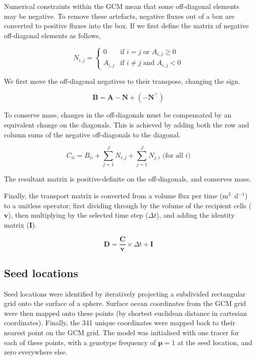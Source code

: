 \documentclass[12pt]{article}
\begin{document}
Numerical constraints within the GCM mean that some off-diagonal elements may be negative. To remove these artefacts, negative fluxes out of a box are converted to positive fluxes into the box. If we first define the matrix of negative off-diagonal elements as follows,

\begin{equation}
N_{i,j} = 
\begin{cases}
0 		& \text{if $i=j$ or $A_{i,j}\ge 0$}\\
A_{i,j} 	& \text{if $i\ne j$ and $A_{i,j}<0 $}
\end{cases}
\end{equation}

We first move the off-diagonal negatives to their transpose, changing the sign.

\begin{equation}
\mathbf{B} = \mathbf{A} - \mathbf{N} + ( - \mathbf{N}^\top)
\end{equation}

To conserve mass, changes in the off-diagonals must be compensated by an equivalent change on the diagonals. This is achieved by adding both the row and column sums of the negative off-diagonals to the diagonal. 

\begin{equation}
C_{i i} = B_{i i} + \sum_{j=1}^J N_{i,j} + \sum_{j=1}^J N_{j,i} \text{ (for all $i$)}
\end{equation}

The resultant matrix is positive-definite on the off-diagonals, and conserves mass.

Finally, the transport matrix is converted from a volume flux per time (m$^3$~d$^{-1}$) to a unitless operator; first dividing through by the volume of the recipient cells ($\mathbf{v}$), then multiplying by the selected time step ($\Delta t$), and adding the identity matrix ($\mathbf{I}$).

\begin{equation}
\mathbf{D} = \frac{\mathbf{C}}{\mathbf{v}} \times \Delta t + \mathbf{I}
\end{equation}

\subsection{Seed locations}

Seed locations were identified by iteratively projecting a subdivided rectangular grid onto the surface of a sphere. Surface ocean coordinates from the GCM grid were then mapped onto these points (by shortest euclidean distance in cartesian coordinates). Finally, the 341 unique coordinates were mapped back to their nearest point on the GCM grid. The model was initialised with one tracer for each of these points, with a genotype frequency of $\mathbf{p} = 1$ at the seed location, and zero everywhere else. 




\end{document}
